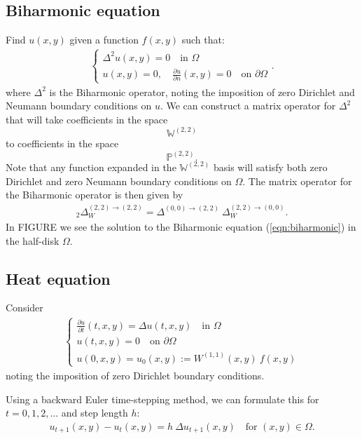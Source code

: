 \documentclass[11pt, oneside]{article}   	%
\newcommand{\bigP}{\mathbb{P}}
\newcommand{\Wii}{W^{(1,1)}}
\newcommand{\laplacewtt}{\Delta_W^{(2,2)\to(0,0)}}
\newcommand{\laplaceoo}{\Delta^{(0,0)\to(2,2)}}
\newcommand{\biharmonic}{_2\Delta_W^{(2,2)\to(2,2)}}
\newcommand{\bigW}{\mathbb{W}}
\begin{document}
\subsection{Biharmonic equation}

Find \(u(x,y)\) given a function \(f(x,y)\) such that:
\begin{align}
	\begin{cases}
    		\Delta^2 u(x,y) = 0 \quad \text{in } \Omega \\
		u(x,y) = 0, \quad \frac{\partial u}{\partial n}(x,y) = 0 \quad \text{on } \partial \Omega
	\end{cases}.
	\label{eqn:biharmonic}
\end{align}
where $\Delta^2$ is the Biharmonic operator, noting the imposition of zero Dirichlet and Neumann boundary conditions on $u$. We can construct a matrix operator for $\Delta^2$ that will take coefficients in the space
$$
\bigW^{(2,2)}
$$
to coefficients in the space
$$
\bigP^{(2,2)}.
$$
Note that any function expanded in the $\bigW^{(2,2)}$ basis will satisfy both zero Dirichlet and zero Neumann boundary conditions on $\Omega$. The matrix operator for the Biharmonic operator is then given by
\begin{align}
	\biharmonic = \laplaceoo \: \laplacewtt.
\end{align}
In FIGURE we see the solution to the Biharmonic equation (\ref{eqn:biharmonic}) in the half-disk $\Omega$.


\subsection{Heat equation}
Consider
\begin{align}
	\begin{cases}
		\frac{\partial u}{\partial t}(t,x,y) = \Delta u(t,x,y) \quad \text{in } \Omega \\
		u(t, x, y) = 0 \quad \text{on } \partial \Omega \\
		u(0, x, y) = u_0(x,y) := \Wii(x,y) \: f(x,y)
	\end{cases}
\end{align}
noting the imposition of zero Dirichlet boundary conditions.

Using a backward Euler time-stepping method, we can formulate this for \(t = 0,1,2,\dots\) and step length $h$:
\begin{align}
u_{t+1}(x,y) - u_t (x,y) = h \: \Delta u_{t+1}(x,y) \quad \text{for } (x,y) \in \Omega.
\end{align}
\end{document}

